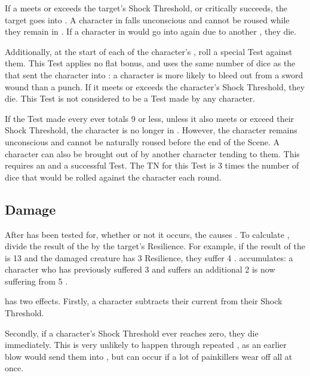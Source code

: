 If a  meets or exceeds the target's Shock Threshold, or critically succeeds, the target goes into {\shock}.
A character in {\shock} falls unconscious and cannot be roused while they remain in {\shock}.
If a character in {\shock} would go into {\shock} again due to another , they die.

Additionally, at the start of each of the {\shocked} character's {\turns}, roll a special Test against them.
This Test applies no flat bonus, and uses the same number of dice as the  that sent the character into {\shock}: a character is more likely to bleed out from a sword wound than a punch.
If it meets or exceeds the {\shocked} character's Shock Threshold, they die.
This Test is not considered to be a Test made by any character.

If the Test made every {\turn} ever totals 9 or less, unless it also meets or exceed their Shock Threshold, the character is no longer in {\shock}.
However, the character remains unconscious and cannot be naturally roused before the end of the Scene.
A character can also be brought out of {\shock} by another character tending to them.
This requires an {\action} and a successful  Test.
The TN for this Test is 3 times the number of dice that would be rolled against the {\shocked} character each round.

\subsection{Damage}

After {\shock} has been tested for, whether or not it occurs, the  causes {\damage}.
To calculate {\damage}, divide the result of the  by the target's Resilience.
For example, if the result of the  is 13 and the damaged creature has 3 Resilience, they suffer 4 {\damage}.
{\damage} accumulates: a character who has previously suffered 3 {\damage} and suffers an additional 2 is now suffering from 5 {\damage}.

{\damage} has two effects.
Firstly, a character subtracts their current {\damage} from their Shock Threshold.

Secondly, if a character's Shock Threshold ever reaches zero, they die immediately.
This is very unlikely to happen through repeated {\damage}, as an earlier blow would send them into {\shock}, but can occur if a lot of painkillers wear off all at once.

